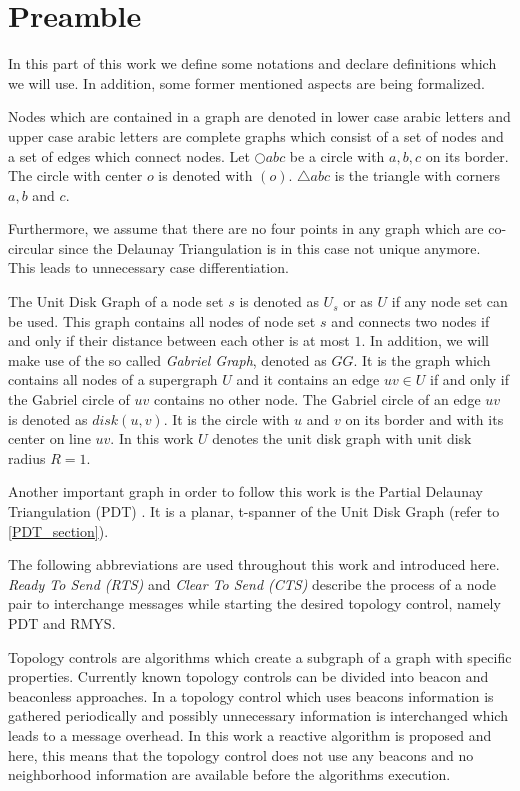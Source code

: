 \section{Preamble}
In this part of this work we define some notations and declare definitions which we will use.
In addition, some former mentioned aspects are being formalized.

Nodes which are contained in a graph are denoted in lower case arabic letters and upper case arabic letters are complete graphs which consist of a set of nodes and a set of edges which connect nodes.
Let $\bigcirc{abc} $ be a circle with $a, b, c $ on its border.
The circle with center $o $ is denoted with $(o) $.
$\triangle{abc} $ is the triangle with corners $a,b $ and $c $.

Furthermore, we assume that there are no four points in any graph which are co-circular since the Delaunay Triangulation is in this case not unique anymore.
This leads to unnecessary case differentiation.

The Unit Disk Graph of a node set $s $ is denoted as $U_s $ or as $U $ if any node set can be used.
This graph contains all nodes of node set $s $ and connects two nodes if and only if their distance between each other is at most $1 $.
In addition, we will make use of the so called \emph{Gabriel Graph}, denoted as $GG $. 
It is the graph which contains all nodes of a supergraph $U $ and it contains an edge $uv \in U $ if and only if the Gabriel circle of $uv $ contains no other node.
The Gabriel circle of an edge $uv $ is denoted as $disk(u, v) $.
It is the circle with $u $ and $v $ on its border and with its center on line $uv $. 
In this work $U $ denotes the unit disk graph with unit disk radius $R = 1 $.

Another important graph in order to follow this work is the Partial Delaunay Triangulation (PDT)  \cite{pdt}. It is a planar, t-spanner of the Unit Disk Graph (refer to \ref{PDT_section}).

The following abbreviations are used throughout this work and introduced here.
\emph{Ready To Send (RTS)} and \emph{Clear To Send (CTS)} describe the process of a node pair to interchange messages while starting the desired topology control, namely PDT and RMYS.

Topology controls are algorithms which create a subgraph of a graph with specific properties.
Currently known topology controls can be divided into beacon and beaconless approaches.
In a topology control which uses beacons information is gathered periodically and possibly unnecessary information is interchanged which leads to a message overhead.
In this work a reactive algorithm is proposed and here, this means that the topology control does not use any beacons and no neighborhood information are available before the algorithms execution.


